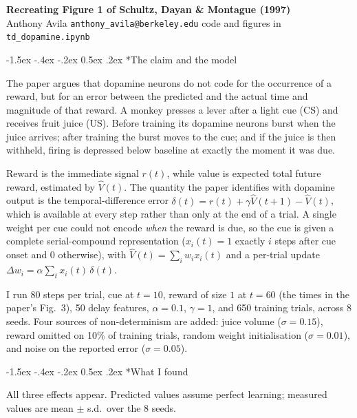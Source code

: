 \documentclass[10pt]{article}
\makeatletter
\renewcommand\section{\@startsection{section}{1}{\z@}%
  {-1.5ex \@plus -.4ex \@minus -.2ex}%
  {0.5ex \@plus .2ex}%
  {\normalfont\bfseries}}
\makeatother
\begin{document}
\small

\begin{center}
  {\large\bfseries Recreating Figure 1 of Schultz, Dayan \& Montague (1997)}\\[1pt]
  {\small Anthony Avila \quad\textbullet\quad \texttt{anthony\_avila@berkeley.edu}
  \quad\textbullet\quad code and figures in \texttt{td\_dopamine.ipynb}}
\end{center}

\section*{The claim and the model}

The paper argues that dopamine neurons do not code for the occurrence of a reward, but for an error
between the predicted and the actual time and magnitude of that reward. A monkey presses a lever
after a light cue (CS) and receives fruit juice (US). Before training its dopamine neurons burst when
the juice arrives; after training the burst moves to the cue; and if the juice is then withheld,
firing is depressed below baseline at exactly the moment it was due.

Reward is the immediate signal $r(t)$, while value is expected total future reward, estimated by
$\hat{V}(t)$. The quantity the paper identifies with dopamine output is the temporal-difference
error $\delta(t) = r(t) + \gamma\hat{V}(t+1) - \hat{V}(t)$, which is available at every step rather
than only at the end of a trial. A single weight per cue could not encode \emph{when} the reward is
due, so the cue is given a complete serial-compound representation ($x_i(t) = 1$ exactly $i$ steps
after cue onset and $0$ otherwise), with $\hat{V}(t) = \sum_i w_i x_i(t)$ and a per-trial update
$\Delta w_i = \alpha \sum_t x_i(t)\,\delta(t)$.

I run 80 steps per trial, cue at $t=10$, reward of size $1$ at $t=60$ (the times in the paper's Fig.~3), 50 delay features, $\alpha = 0.1$, $\gamma = 1$, and 650 training trials, across 8 seeds.
Four sources of non-determinism are added: juice volume ($\sigma = 0.15$), reward omitted on 10\% of
training trials, random weight initialisation ($\sigma = 0.01$), and noise on the reported error
($\sigma = 0.05$).

\section*{What I found}

All three effects appear. Predicted values assume perfect learning; measured values are mean
$\pm$ s.d.\ over the 8 seeds.
\end{document}
